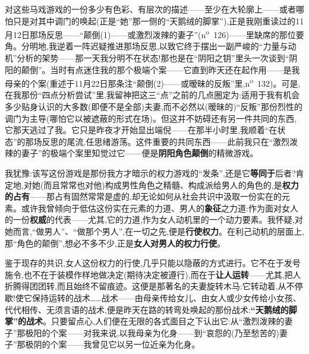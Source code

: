 对这些马戏游戏的一份多少有色彩、有层次的描述——至少在大轮廓上——或者哪怕只是对其中调门的唤起(正是“她”那一侧的“天鹅绒的脚掌”),正是我刚重读过的11月12日那场反思——“颠倒(1)——或激烈泼辣的妻子”(n\textsuperscript{o}~126)——里缺席的那位要角。分明地,我逆着一阵迟疑推进那场反思,以致它终于摆出一副严峻的“力量与动机”分析的架势——那一天我分明不在状态!那也是在“阴阳之钥”里头一次谈到“阴阳的颠倒”。当时有点迷住我的那个极端个案——它直到昨天还在起作用——是我母亲的个案(重述于11月22日那条注“颠倒(2)——或暧昧的反叛”里,n\textsuperscript{o}~132)。可是,在我那份“四点分析尝试”里,我留神把这三“点”之前的几点圈定为:适用于我有机会多少贴身认识的大多数(即便不是全部)夫妻,而不必然以(暧昧的)“反叛”那份烈性的调门为主导(哪怕它以被遮蔽的形式在场)\dmark{}。但这并不妨碍还有另一件共同的东西,它那天逃过了我。它只是昨夜才开始显出端倪——在那半小时里,我顺着“在状态”的那场反思的尾流,任思绪游荡。这件重要的共同东西——此前我只在“激烈泼辣的妻子”的极端个案里知觉过它——便是\textbf{阴阳角色颠倒}的精微游戏。

我犹豫:该写这份游戏是那份我方才暗示的权力游戏的“发条”,还是它\textbf{等同于}后者?肯定地,对她(而且常常也对他)构成男性角色之精髓、构成派给男人的角色的,是\textbf{权力的占有}——那占有固然常常是虚的,却无论如何从社会共识中汲取一份实在的元素。或许我曾倾向于低估这份实在元素的力道、男人的\textbf{象征}之力道:作为面对女人的一份\textbf{权威}的代表——尤其,它的力道,作为女人动机里的一个动力要素。我怀疑,对她而言,“做男人”、“做那个男人”,在一切之先,便是\textbf{行使权力}。在利己动机的层面上,那“角色的颠倒”,想必不多不少,正是\textbf{女人对男人的权力行使}。

鉴于现存的共识,女人这份权力的行使,几乎只能以隐蔽的方式进行。它不在于发号施令,也不在于\dmark{}装模作样地做决定(期待决定被遵行),而在于\textbf{让人运转}——尤其,把人折腾得团团转,而且始终不留痕迹。这便是那著名的夫妻旋转木马:它转动着,从不停歇!使它保持运转的战术……战术——由母亲传给女儿、由女人或少女传给小女孩、代代相传、无须言语的战术,便是昨天在路的转弯处唤起的那份战术:\textbf{“天鹅绒的脚掌”的战术}。只要留点心,人们便在无限的各式面目之下认出它:从“激烈泼辣的妻子”那极阳的个案——对我来说,以我母亲为化身——到“哀怨的(乃至愁苦的)妻子”那极阴的个案——我曾见它以另一位近亲为化身。

